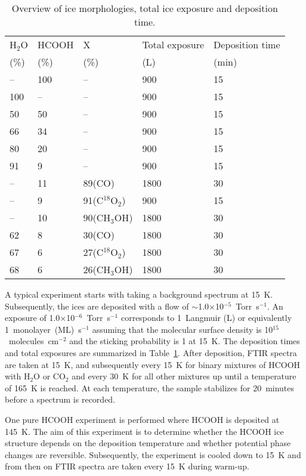 \documentclass{aa}
\begin{document}
\begin{table}
\caption{Overview of ice morphologies, total ice exposure and
deposition time.}\label{sample} \centering
\begin{tabular}{lll|ll}
\hline
\hline
H$_2$O & HCOOH & X & Total exposure & Deposition time\\
  (\%)     & (\%)      & (\%)  & (L)      & (min)\\
\hline
--     & 100   & -- & \phantom{1}900           & 15\\ 
100    & --    & -- & \phantom{1}900           & 15\\
50   & 50  & -- & \phantom{1}900               & 15\\
66   & 34  & -- & \phantom{1}900               & 15\\
80   & 20  & -- & \phantom{1}900               & 15\\
91   & 9   & -- & \phantom{1}900             & 15\\
-- & 11 & 89(CO) & 1800             & 30\\
-- & 9 & 91(C$^{18}$O$_2$) & \phantom{1}900  & 15\\
-- & 10 & 90(CH$_3$OH) & 1800    & 30\\
62  & 8     & 30(CO)       & 1800     & 30\\
67  & 6     & 27(C$^{18}$O$_2$) & 1800 & 30\\
68  & 6     & 26(CH$_3$OH) & 1800     & 30\\
\hline
\end{tabular}
\end{table}

A typical experiment starts with taking a background spectrum at
15~K. Subsequently, the ices are deposited with a flow of
$\sim$1.0$\times$10$^{-5}$~Torr~s$^{-1}$. An exposure of
1.0$\times$10$^{-6}$~Torr~s$^{-1}$ corresponds to 1~Langmuir (L) or
equivalently 1~monolayer~(ML)~s$^{-1}$ assuming that the molecular
surface density is 10$^{15}$~molecules~cm$^{-2}$ and the sticking
probability is 1 at 15~K. The deposition times and total exposures are
summarized in Table~\ref{sample}. After deposition, FTIR spectra are
taken at 15~K, and subsequently every 15~K for binary mixtures of
HCOOH with H$_2$O or CO$_2$ and every 30~K for all other mixtures up
until a temperature of 165~K is reached. At each temperature, the
sample stabilizes for 20~minutes before a spectrum is recorded.

One pure HCOOH experiment is performed where HCOOH is deposited at
145~K. The aim of this experiment is to determine whether the HCOOH
ice structure depends on the deposition temperature and whether
potential phase changes are reversible. Subsequently, the experiment
is cooled down to 15~K and from then on FTIR spectra are taken every
15~K during warm-up.
\end{document}
